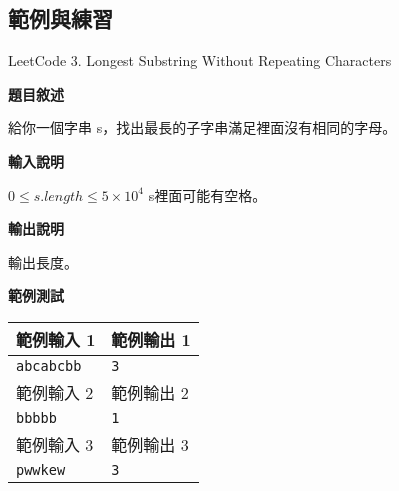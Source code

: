     \subsection{範例與練習}

    \problem LeetCode 3. Longest Substring Without Repeating Characters

    \textbf{題目敘述}

    給你一個字串 s，找出最長的子字串滿足裡面沒有相同的字母。

    \textbf{輸入說明}

    $0 \le s.length \le 5 \times 10^4$
    s裡面可能有空格。
    
    \textbf{輸出說明}

    輸出長度。

    \textbf{範例測試}

    \begin{tabular}{|m{7cm}|m{7cm}|}
        \hline
        範例輸入 1 & 範例輸出 1 \\
        \hline
        \verb|abcabcbb| & \verb|3| \\
        \hline
        範例輸入 2 & 範例輸出 2 \\
        \hline
        \verb|bbbbb| & \verb|1| \\
        \hline
        範例輸入 3 & 範例輸出 3 \\
        \hline
        \verb|pwwkew| & \verb|3|\\
        \hline
    \end{tabular}